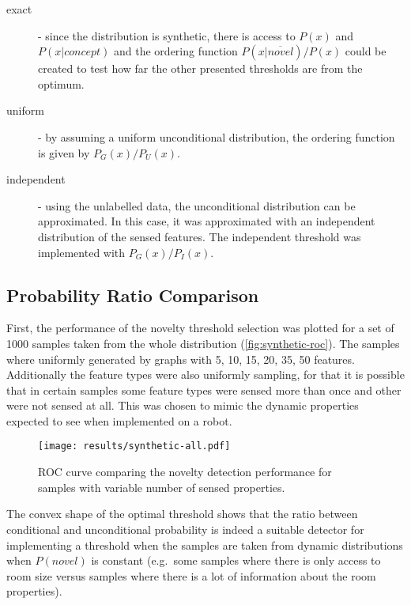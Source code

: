 \begin{description}
\item[exact] 
- since the distribution is synthetic, there is access to $P(x)$ and $P(x|concept)$
and the ordering function $P(x|\overline{novel})/P(x)$ could be created
to test how far the other presented thresholds are from the optimum.

\item[uniform]
- by assuming a uniform unconditional distribution, the ordering function is
  given by $P_G(x)/P_U(x)$.

\item[independent]
- using the unlabelled data, the unconditional distribution can be approximated.
  In this case, it was approximated with an independent distribution of the
  sensed features. The independent threshold was implemented with $P_G(x)/P_I(x)$.
\end{description}


\subsection{Probability Ratio Comparison}
First, the performance of the novelty threshold selection was plotted for a set
of 1000 samples taken from the whole distribution (\autoref{fig:synthetic-roc}).
The samples where uniformly generated by graphs with 5, 10, 15, 20, 35, 50 features.
Additionally the feature types were also uniformly sampling, for that it is possible
that in certain samples some feature types were sensed more than once and other were not
sensed at all.
This was chosen to mimic
the dynamic properties expected to see when implemented on a robot.

\begin{figure}[h]
\centering
\texttt{[image: results/synthetic-all.pdf]}

\caption{\label{fig:synthetic-roc}ROC curve comparing the novelty detection performance
         for samples with variable number of sensed properties.}
\end{figure}

The convex shape of the optimal threshold shows that the ratio between conditional
and unconditional probability is indeed a suitable detector for implementing a threshold when
the samples are taken from dynamic distributions when $P(novel)$ is constant
(e.g.\ some samples where there is only access to room size versus
samples where there is a lot of information about the room properties).

